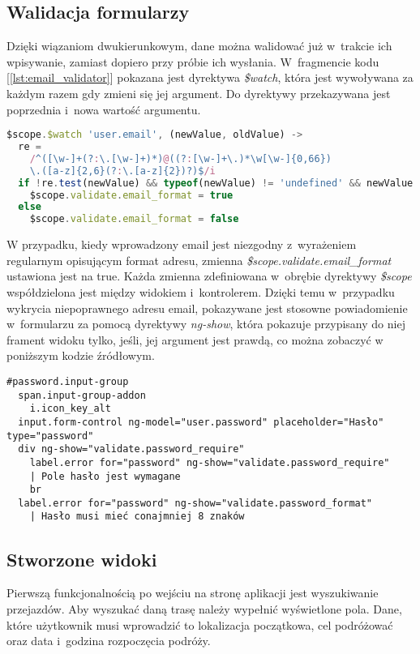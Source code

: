 \documentclass[eng,archivemode]{mgr}
\begin{document}
\subsection{Walidacja formularzy}
Dzięki wiązaniom dwukierunkowym, dane można walidować już w~trakcie ich wpisywanie, zamiast dopiero przy próbie ich wysłania. W~fragmencie kodu [\ref{lst:email_validator}] pokazana jest dyrektywa \textit{\$watch}, która jest wywoływana za każdym razem gdy zmieni się jej argument. Do dyrektywy przekazywana jest poprzednia i~nowa wartość argumentu.  
\begin{lstlisting}[language=JavaScript, caption={Walidowanie formatu email}, label=lst:email_validator]
$scope.$watch 'user.email', (newValue, oldValue) ->
  re = 
    /^([\w-]+(?:\.[\w-]+)*)@((?:[\w-]+\.)*\w[\w-]{0,66})
    \.([a-z]{2,6}(?:\.[a-z]{2})?)$/i
  if !re.test(newValue) && typeof(newValue) != 'undefined' && newValue !=''
    $scope.validate.email_format = true
  else
    $scope.validate.email_format = false
\end{lstlisting}
W przypadku, kiedy wprowadzony email jest niezgodny z~wyrażeniem regularnym opisującym format adresu, zmienna \textit{\$scope.validate.email\_format} ustawiona jest na true. Każda zmienna zdefiniowana w~obrębie dyrektywy \textit{\$scope} współdzielona jest między widokiem i~kontrolerem. Dzięki temu w~przypadku wykrycia niepoprawnego adresu email, pokazywane jest stosowne powiadomienie w~formularzu za pomocą dyrektywy \textit{ng-show}, która pokazuje przypisany do niej frament widoku tylko, jeśli, jej argument jest prawdą, co można zobaczyć w poniższym kodzie źródłowym.
\begin{lstlisting}[language=Slim, caption={Walidowanie foramtu email}, label=lst:email_validator_template]
#password.input-group
  span.input-group-addon
    i.icon_key_alt
  input.form-control ng-model="user.password" placeholder="Hasło" type="password"
  div ng-show="validate.password_require"
    label.error for="password" ng-show="validate.password_require"
    | Pole hasło jest wymagane
    br
  label.error for="password" ng-show="validate.password_format"
    | Hasło musi mieć conajmniej 8 znaków
\end{lstlisting}
\newpage
\subsection{Stworzone widoki}

Pierwszą funkcjonalnością po wejściu na stronę aplikacji jest wyszukiwanie przejazdów. Aby wyszukać daną trasę należy wypełnić wyświetlone pola. Dane, które użytkownik musi wprowadzić to lokalizacja początkowa, cel podróżować oraz data i~godzina rozpoczęcia podróży.
\end{document}
